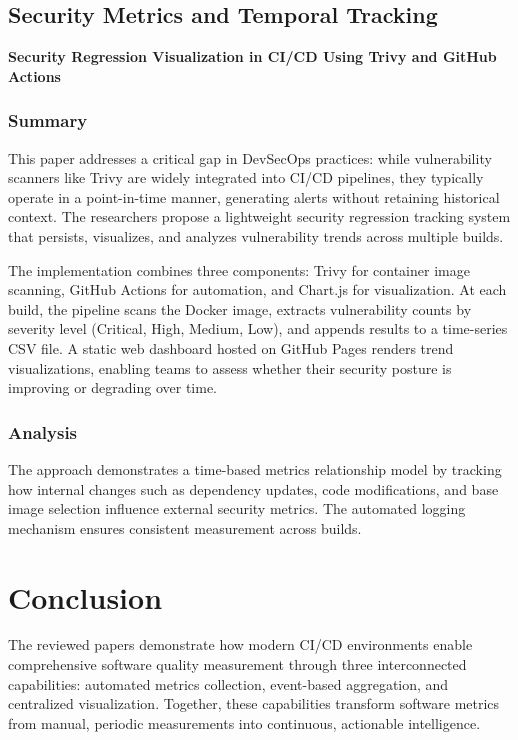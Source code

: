 \documentclass[12pt]{article}
\begin{document}
\subsection{Security Metrics and Temporal Tracking}

\textbf{Security Regression Visualization in CI/CD Using Trivy
	and GitHub Actions} \cite{zhuravchak2025security}

\subsubsection{Summary}
This paper addresses a critical gap in DevSecOps practices: while
vulnerability scanners like Trivy are widely integrated into CI/CD
pipelines, they typically operate in a point-in-time manner,
generating alerts without retaining historical context. The researchers
propose a lightweight security regression tracking system that persists,
visualizes, and analyzes vulnerability trends across multiple builds.

The implementation combines three components: Trivy for container
image scanning, GitHub Actions for automation, and Chart.js for
visualization. At each build, the pipeline scans the Docker image,
extracts vulnerability counts by severity level (Critical, High, Medium,
Low), and appends results to a time-series CSV file. A static web
dashboard hosted on GitHub Pages renders trend visualizations,
enabling teams to assess whether their security posture is improving
or degrading over time.

\subsubsection{Analysis}
The approach demonstrates a time-based metrics relationship model by tracking
how internal changes such as dependency updates, code modifications, and base
image selection influence external security metrics. The automated
logging mechanism ensures consistent measurement across builds.

\section{Conclusion}

The reviewed papers demonstrate how modern CI/CD environments enable
comprehensive software quality measurement through three interconnected
capabilities: automated metrics collection, event-based aggregation,
and centralized visualization. Together, these capabilities transform
software metrics from manual, periodic measurements into continuous,
actionable intelligence.
\end{document}
